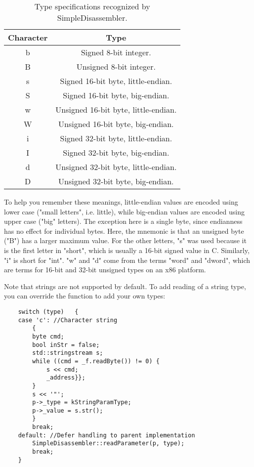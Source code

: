 \begin{table}[!hpbt]
\centering
\begin{tabular}{c | c}
Character & Type \\
\hline
b & Signed 8-bit integer. \\
B & Unsigned 8-bit integer. \\
s & Signed 16-bit byte, little-endian. \\
S & Signed 16-bit byte, big-endian. \\
w & Unsigned 16-bit byte, little-endian. \\
W & Unsigned 16-bit byte, big-endian. \\
i & Signed 32-bit byte, little-endian. \\
I & Signed 32-bit byte, big-endian. \\
d & Unsigned 32-bit byte, little-endian. \\
D & Unsigned 32-bit byte, big-endian. \\
\end{tabular}
\caption{Type specifications recognized by SimpleDisassembler.}
\label{tbl:paramtypes}
\end{table}

To help you remember these meanings, little-endian values are encoded using lower case ("small letters", i.e. little), while big-endian values are encoded using upper case ("big" letters). The exception here is a single byte, since endianness has no effect for individual bytes. Here, the mnemonic is that an unsigned byte ("B") has a larger maximum value. For the other letters, "s" was used because it is the first letter in "short", which is usually a 16-bit signed value in C. Similarly, "i" is short for "int". "w" and "d" come from the terms "word" and "dword", which are terms for 16-bit and 32-bit unsigned types on an x86 platform.

Note that strings are not supported by default. To add reading of a string type, you can override the  function to add your own types:

\begin{C++}
\begin{lstlisting}
	switch (type)	{
	case 'c': //Character string
		{
		byte cmd;
		bool inStr = false;
		std::stringstream s;
		while ((cmd = _f.readByte()) != 0) {
			s << cmd;
			_address}};
		}
		s << '"';
		p->_type = kStringParamType;
		p->_value = s.str();
		}
		break;
	default: //Defer handling to parent implementation
		SimpleDisassembler::readParameter(p, type);
		break;
	}
\end{lstlisting}
\end{C++}

